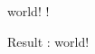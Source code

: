 \def\prepend#1#2{%
	\def\tempstring{#1}%
	\expandafter\expandafter\expandafter
	\def\expandafter\expandafter\expandafter
	#2\expandafter\expandafter\expandafter
	{\expandafter\tempstring#2}%
}
\def\mystring{world!}
\prepend{Hello }\mystring
Result : \mystring
\bye
